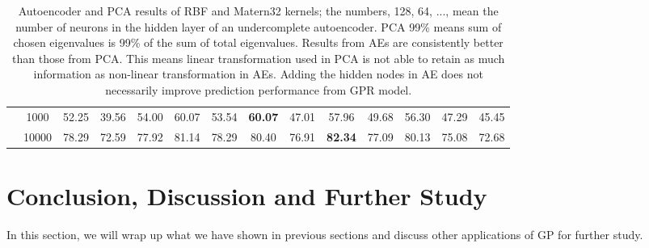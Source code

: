 \documentclass[11pt,a4paper]{article}
\theoremstyle{definition}
\numberwithin{equation}{section}
\begin{document}
\begin{table}
{\begin{tabular}{c|c|cc|cc|cc|cc|cc|cc}
				& 1000  & 52.25 & 39.56            & 54.00 & 60.07            & 53.54 & \textbf{60.07}  & 47.01 & 57.96           & 49.68 & 56.30           & 47.29 & 45.45                 \\
				& 10000 & 78.29 & 72.59            & 77.92 & 81.14            & 78.29 & 80.40           & 76.91 & \textbf{82.34}  & 77.09 & 80.13           & 75.08 & 72.68                 \\
				\bottomrule
			\end{tabular}}
			\caption{Autoencoder and PCA results of RBF and Matern32 kernels; the numbers, 128, 64, ..., mean the number of neurons in the hidden layer of an undercomplete autoencoder. PCA 99\% means sum of chosen eigenvalues is 99\% of the sum of total eigenvalues. Results from AEs are consistently better than those from PCA. This means linear transformation used in PCA is not able to retain as much information as non-linear transformation in AEs. Adding the hidden nodes in AE does not necessarily improve prediction performance from GPR model.}
			\label{dim_red_res}
		\end{table}
		
		
		\newpage
		\section{Conclusion, Discussion and Further Study}
		
		In this section, we will wrap up what we have shown in previous sections and discuss other applications of GP for further study.
		
\end{document}
